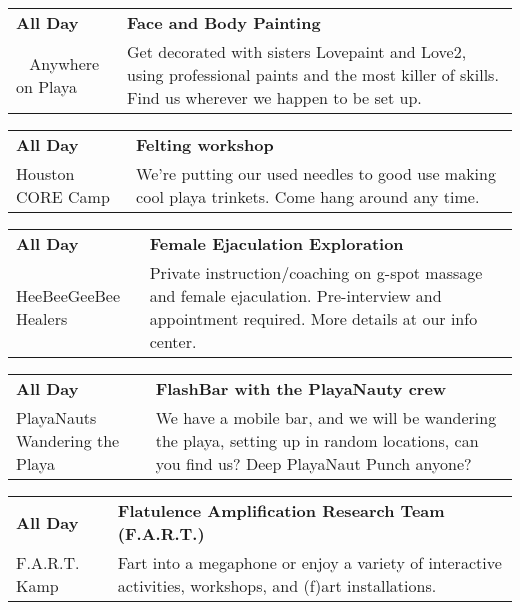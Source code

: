 \begin{tabular}{ p{1in} p{2.2in} }
    \textbf{All Day} & \textbf{Face and Body Painting} \\
    ~ \newline Anywhere on Playa & Get decorated with sisters Lovepaint and Love2, using professional paints and the most killer of skills. Find us wherever we happen to be set up. \\
    \hline 
\end{tabular}
    
\begin{tabular}{ p{1in} p{2.2in} }
    \textbf{All Day} & \textbf{Felting workshop} \\
    Houston CORE Camp \newline  & We're putting our used needles to good use making cool playa trinkets. Come hang around any time. \\
    \hline 
\end{tabular}
    
\begin{tabular}{ p{1in} p{2.2in} }
    \textbf{All Day} & \textbf{Female Ejaculation Exploration} \\
    HeeBeeGeeBee Healers \newline  & Private instruction/coaching on g-spot massage and female ejaculation.  Pre-interview and appointment required.  More details at our info center. \\
    \hline 
\end{tabular}
    
\begin{tabular}{ p{1in} p{2.2in} }
    \textbf{All Day} & \textbf{FlashBar with the PlayaNauty crew} \\
    PlayaNauts \newline Wandering the Playa & We have a mobile bar, and we will be wandering the playa, setting up in random locations, can you find us?
Deep PlayaNaut Punch anyone? \\
    \hline 
\end{tabular}
    
\begin{tabular}{ p{1in} p{2.2in} }
    \textbf{All Day} & \textbf{Flatulence Amplification Research Team (F.A.R.T.) } \\
    F.A.R.T. Kamp \newline  & Fart into a megaphone or enjoy a variety of interactive activities, workshops, and (f)art installations. \\
    \hline 
\end{tabular}
    
